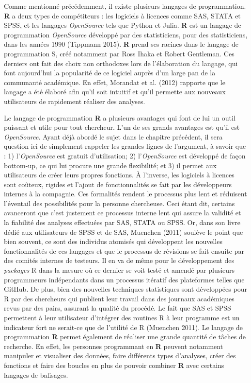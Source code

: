 \documentclass[
  letterpaper,
]{scrbook}
\begin{document}
Comme mentionné précédemment, il existe plusieurs langages de
programmation. \textbf{R} a deux types de compétiteurs : les logiciels à
licences comme SAS, STATA et SPSS, et les langages \emph{OpenSource}
tels que Python et Julia. \textbf{R} est un langage de programmation
\emph{OpenSource} développé par des statisticiens, pour des
statisticiens, dans les années 1990 (Tippmann 2015). \textbf{R} prend
ses racines dans le langage de programmation S, créé notamment par Ross
Ihaka et Robert Gentleman. Ces derniers ont fait des choix non
orthodoxes lors de l'élaboration du langage, qui font aujourd'hui la
popularité de ce logiciel auprès d'un large pan de la communauté
académique. En effet, Morandat et al. (2012) rapporte que le langage a
été élaboré afin qu'il soit intuitif et qu'il permette aux nouveaux
utilisateurs de rapidement réaliser des analyses.

Le langage de programmation \textbf{R} a plusieurs avantages qui font de
lui un outil puissant et utile pour tout chercheur. L'un de ses grands
avantages est qu'il est \emph{OpenSource}. Ayant déjà abordé le sujet
dans le chapitre précédent, il sera question ici de simplement rappeler
les grandes lignes de l'argument, à savoir que : 1) l'\emph{OpenSource}
est gratuit d'utilisation; 2) l'\emph{OpenSource} est développé de façon
bottom-up, ce qui lui procure une grande flexibilité; et 3) il permet
aux utilisateurs de créer leurs propres fonctions. À l'inverse, les
logiciels à licences sont coûteux, rigides et l'ajout de fonctionnalités
se fait par les développeurs internes à la compagnie. Ces formalités
rendent le processus plus lent et réduisent l'éventail des possibilités
pour la personne chercheuse. Ceci étant dit, certains avanceront que
c'est justement ce processus interne lent qui assure la validité et la
fiabilité des analyses effectuées par SAS, STATA ou SPSS. Or, dans son
livre dédié aux utilisateurs de SPSS et de SAS, Muenchen (2011) soulève
le point que bien souvent, ce sont des individus atomisés qui
développent les nouvelles fonctionnalités de ces langages et que le
processus de révisions se fait ensuite par des comités internes de
testeurs. Il en va de même pour le développement des \emph{packages} R
dans la mesure où ce dernier se voit testé et amendé par plusieurs
programmeurs indépendants dans un processus itératif des plateformes
telles que GitHub. De plus, bien des nouvelles techniques statistiques
sont développées pour R par des chercheurs qui publient leur travail
dans des journaux académiques revus par des pairs, assurant la qualité
du procédé. Le fait que SAS et SPSS permettent à leur utilisateur
d'intégrer des routines R à leur programme est un indicateur fort ne
serait-ce que de l'utilité de R (Muenchen 2011). Le langage de
programmation \textbf{R} permet également de réaliser une grande
quantité de tâches de recherche. En effet, les personnes programmant en
\textbf{R} peuvent notamment manipuler et visualiser des données, faire
différents types d'analyses, créer des fonctions et faire des boucles en
plus de pouvoir combiner \textbf{R} avec certains langages de balisages.
\end{document}
